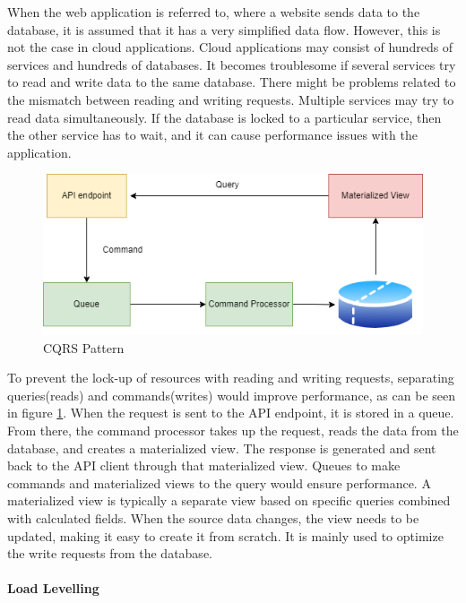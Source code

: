 \documentclass[12pt,a4paper]{article}
\begin{document}
When the web application is referred to, where a website sends data to the database, it is assumed that it has a very simplified data flow. However, this is not the case in cloud applications. Cloud applications may consist of hundreds of services and hundreds of databases. It becomes troublesome if several services try to read and write data to the same database. There might be problems related to the mismatch between reading and writing requests. Multiple services may try to read data simultaneously. If the database is locked to a particular service, then the other service has to wait, and it can cause performance issues with the application. \cite{r25}

\begin{figure}[H]
\centering
\includegraphics[scale=0.75]{cqrs.PNG}
\caption{CQRS Pattern \cite{r25}}
\label{cqrs}
\end{figure}

To prevent the lock-up of resources with reading and writing requests, separating queries(reads) and commands(writes) would improve performance, as can be seen in figure \ref{cqrs}. When the request is sent to the API endpoint, it is stored in a queue. From there, the command processor takes up the request, reads the data from the database, and creates a materialized view. The response is generated and sent back to the API client through that materialized view. Queues to make commands and materialized views to the query would ensure performance. A materialized view is typically a separate view based on specific queries combined with calculated fields. When the source data changes, the view needs to be updated, making it easy to create it from scratch. It is mainly used to optimize the write requests from the database. \cite{r25}

\paragraph{Load Levelling}
\end{document}

